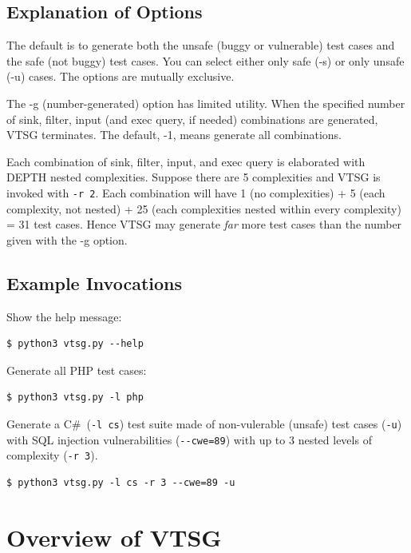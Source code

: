 \documentclass[12pt]{article}
\newcommand{\CSharp}{C{\fontseries{b}\selectfont\#}}
\begin{document}
\subsection{Explanation of Options}

The default is to generate both the unsafe (buggy or vulnerable)
test cases and the safe (not buggy) test cases.  You can select
either only safe (-s) or only unsafe (-u) cases.  The options are
mutually exclusive.

The -g (number-generated) option has limited utility.  When the
specified number of sink, filter, input (and exec query, if needed)
combinations are generated, VTSG terminates.  The default, -1,
means generate all combinations.

Each combination of sink, filter, input, and exec query is elaborated
with DEPTH nested complexities.  Suppose there are 5 complexities
and VTSG is invoked with \verb|-r 2|.  Each combination will have
1 (no complexities) + 5 (each complexity, not nested) + 
25 (each complexities nested within every complexity) = 31 test cases.  
Hence VTSG may generate \emph{far} more test cases than the number
given with the -g option.

\subsection{Example Invocations}

Show the help message:
\begin{verbatim}
$ python3 vtsg.py --help
\end{verbatim}

Generate all PHP test cases:
\begin{verbatim}
$ python3 vtsg.py -l php
\end{verbatim}

Generate a \CSharp\ (\verb|-l cs|) test suite made of non-vulerable (unsafe) test
cases (\verb|-u|) with SQL injection vulnerabilities (\verb|--cwe=89|) 
with up to 3 nested levels of complexity (\verb|-r 3|).
\begin{verbatim}
$ python3 vtsg.py -l cs -r 3 --cwe=89 -u
\end{verbatim}
 
\section{Overview of VTSG}
\end{document}
